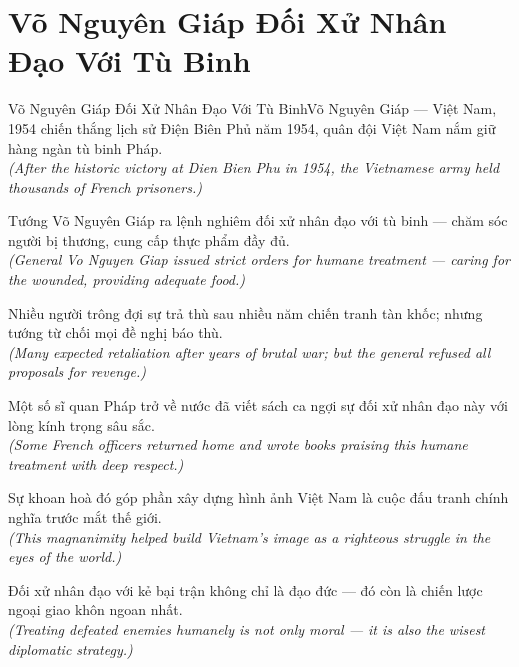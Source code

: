 \section{Võ Nguyên Giáp Đối Xử Nhân Đạo Với Tù Binh}
\begin{truyen}{Võ Nguyên Giáp Đối Xử Nhân Đạo Với Tù Binh}{Võ Nguyên Giáp --- Việt Nam, 1954}
 chiến thắng lịch sử Điện Biên Phủ năm 1954, quân đội Việt Nam nắm giữ hàng ngàn tù binh Pháp.\\[4pt]
\textit{(After the historic victory at Dien Bien Phu in 1954, the Vietnamese army held thousands of French prisoners.)}

Tướng Võ Nguyên Giáp ra lệnh nghiêm đối xử nhân đạo với tù binh --- chăm sóc người bị thương, cung cấp thực phẩm đầy đủ.\\[4pt]
\textit{(General Vo Nguyen Giap issued strict orders for humane treatment --- caring for the wounded, providing adequate food.)}

Nhiều người trông đợi sự trả thù sau nhiều năm chiến tranh tàn khốc; nhưng tướng từ chối mọi đề nghị báo thù.\\[4pt]
\textit{(Many expected retaliation after years of brutal war; but the general refused all proposals for revenge.)}

Một số sĩ quan Pháp trở về nước đã viết sách ca ngợi sự đối xử nhân đạo này với lòng kính trọng sâu sắc.\\[4pt]
\textit{(Some French officers returned home and wrote books praising this humane treatment with deep respect.)}

Sự khoan hoà đó góp phần xây dựng hình ảnh Việt Nam là cuộc đấu tranh chính nghĩa trước mắt thế giới.\\[4pt]
\textit{(This magnanimity helped build Vietnam's image as a righteous struggle in the eyes of the world.)}

\end{truyen}
\begin{baihoc}
  Đối xử nhân đạo với kẻ bại trận không chỉ là đạo đức --- đó còn là chiến lược ngoại giao khôn ngoan nhất.\\[4pt]
  \textit{(Treating defeated enemies humanely is not only moral --- it is also the wisest diplomatic strategy.)}
\end{baihoc}
